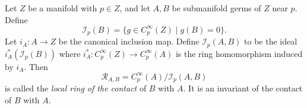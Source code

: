 Let $Z$ be a manifold with $p \in Z$, and let $A, B$ be submanifold germs of $Z$ near $p$. Define
$$
\mathcal{I}_p(B) = \{ g \in C_p^\infty(Z) \mid g(B) = 0 \}.
$$
Let $i_A: A \to Z$ be the canonical inclusion map. Define $\mathcal{I}_p(A, B)$ to be the ideal $i_A^*(\mathcal{I}_p(B))$ where $i_A^*: C_p^\infty(Z) \to C_p^\infty(A)$ is the ring homomorphism induced by $i_A$. Then
$$
\mathcal{R}_{A,B} = C_p^\infty(A) / \mathcal{I}_p(A, B)
$$
is called the \textit{local ring of the contact} of $B$ with $A$. It is an invariant of the contact of $B$ with $A$.
